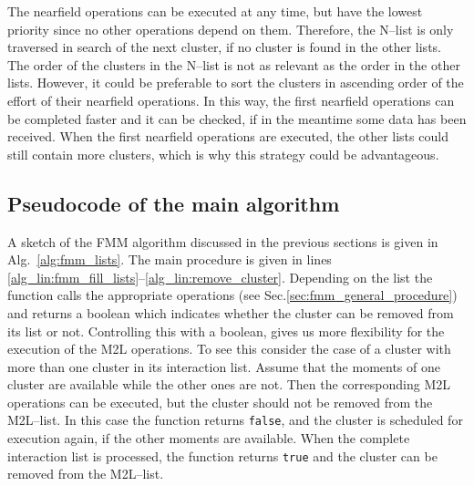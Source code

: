 \documentclass[a4paper,11pt]{article}
\theoremstyle{plain}
\theoremstyle{definition}
\theoremstyle{remark}
\begin{document}
The nearfield operations can be executed at any time, but have the lowest priority since no other operations depend on them. Therefore, the N--list is only traversed in search of the next cluster, if no cluster is found in the other lists. The order of the clusters in the N--list is not as relevant as the order in the other lists. However, it could be preferable to sort the clusters in ascending order of the effort of their nearfield operations. In this way, the first nearfield operations can be completed faster and it can be checked, if in the meantime some data has been received. When the first nearfield operations are executed, the other lists could still contain more clusters, which is why this strategy could be advantageous.

\subsection{Pseudocode of the main algorithm} \label{sec:FMM_pseudocode}
A sketch of the FMM algorithm discussed in the previous sections is given in Alg.~\ref{alg:fmm_lists}. The main procedure is given in lines \ref{alg_lin:fmm_fill_lists}--\ref{alg_lin:remove_cluster}. Depending on the list the function  calls the appropriate operations (see Sec.\ref{sec:fmm_general_procedure}) and returns a boolean which indicates whether the cluster can be removed from its list or not. Controlling this with a boolean, gives us more flexibility for the execution of the M2L operations. To see this consider the case of a cluster with more than one cluster in its interaction list. Assume that the moments of one cluster are available while the other ones are not. Then the corresponding M2L operations can be executed, but the cluster should not be removed from the M2L--list. In this case the function  returns \texttt{false}, and the cluster is scheduled for execution again, if the other moments are available. When the complete interaction list is processed, the function returns \texttt{true} and the cluster can be removed from the M2L--list. 
\end{document}
